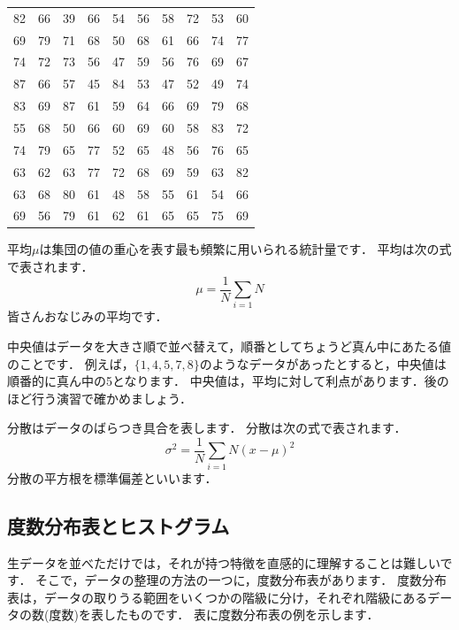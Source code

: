 \documentclass[12pt, a4j]{jreport}
\begin{document}
\begin{table}[htb]
    \begin{tabular}{cccccccccc}
82 & 66 & 39 & 66 & 54 & 56 & 58 & 72 & 53 & 60 \\
69 & 79 & 71 & 68 & 50 & 68 & 61 & 66 & 74 & 77 \\
74 & 72 & 73 & 56 & 47 & 59 & 56 & 76 & 69 & 67 \\
87 & 66 & 57 & 45 & 84 & 53 & 47 & 52 & 49 & 74 \\
83 & 69 & 87 & 61 & 59 & 64 & 66 & 69 & 79 & 68 \\
55 & 68 & 50 & 66 & 60 & 69 & 60 & 58 & 83 & 72 \\
74 & 79 & 65 & 77 & 52 & 65 & 48 & 56 & 76 & 65 \\
63 & 62 & 63 & 77 & 72 & 68 & 69 & 59 & 63 & 82 \\
63 & 68 & 80 & 61 & 48 & 58 & 55 & 61 & 54 & 66 \\
69 & 56 & 79 & 61 & 62 & 61 & 65 & 65 & 75 & 69 \\
    \end{tabular}
    \label{tab:sample}
\end{table}

平均$\mu$は集団の値の重心を表す最も頻繁に用いられる統計量です．
平均は次の式で表されます．
\begin{equation}
    \mu = \frac{1}{N} \sum_{i=1}{N}
\end{equation}
皆さんおなじみの平均です．

中央値はデータを大きさ順で並べ替えて，順番としてちょうど真ん中にあたる値のことです．
例えば，$\{1, 4, 5, 7, 8\}$のようなデータがあったとすると，中央値は順番的に真ん中の5となります．
中央値は，平均に対して利点があります．後のほど行う演習で確かめましょう．

分散はデータのばらつき具合を表します．
分散は次の式で表されます．
\begin{equation}
    \sigma^2 = \frac{1}{N} \sum_{i=1}{N} (x - \mu)^2
\end{equation}
分散の平方根を標準偏差といいます．

\subsection{度数分布表とヒストグラム}

生データを並べただけでは，それが持つ特徴を直感的に理解することは難しいです．
そこで，データの整理の方法の一つに，度数分布表があります．
度数分布表は，データの取りうる範囲をいくつかの階級に分け，それぞれ階級にあるデータの数(度数)を表したものです．
表に度数分布表の例を示します．
\end{document}
